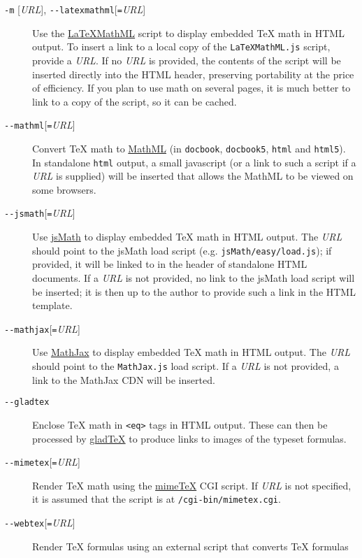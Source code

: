 \documentclass[]{article}
\begin{document}
\begin{description}
\item[\texttt{-m} {[}\emph{URL}{]},
\texttt{-\/-latexmathml}{[}\texttt{=}\emph{URL}{]}]
Use the \href{http://math.etsu.edu/LaTeXMathML/}{LaTeXMathML} script to
display embedded TeX math in HTML output. To insert a link to a local
copy of the \texttt{LaTeXMathML.js} script, provide a \emph{URL}. If no
\emph{URL} is provided, the contents of the script will be inserted
directly into the HTML header, preserving portability at the price of
efficiency. If you plan to use math on several pages, it is much better
to link to a copy of the script, so it can be cached.
\item[\texttt{-\/-mathml}{[}\texttt{=}\emph{URL}{]}]
Convert TeX math to \href{http://www.w3.org/Math/}{MathML} (in
\texttt{docbook}, \texttt{docbook5}, \texttt{html} and \texttt{html5}).
In standalone \texttt{html} output, a small javascript (or a link to
such a script if a \emph{URL} is supplied) will be inserted that allows
the MathML to be viewed on some browsers.
\item[\texttt{-\/-jsmath}{[}\texttt{=}\emph{URL}{]}]
Use \href{http://www.math.union.edu/~dpvc/jsmath/}{jsMath} to display
embedded TeX math in HTML output. The \emph{URL} should point to the
jsMath load script (e.g. \texttt{jsMath/easy/load.js}); if provided, it
will be linked to in the header of standalone HTML documents. If a
\emph{URL} is not provided, no link to the jsMath load script will be
inserted; it is then up to the author to provide such a link in the HTML
template.
\item[\texttt{-\/-mathjax}{[}\texttt{=}\emph{URL}{]}]
Use \href{https://www.mathjax.org}{MathJax} to display embedded TeX math
in HTML output. The \emph{URL} should point to the \texttt{MathJax.js}
load script. If a \emph{URL} is not provided, a link to the MathJax CDN
will be inserted.
\item[\texttt{-\/-gladtex}]
Enclose TeX math in \texttt{\textless{}eq\textgreater{}} tags in HTML
output. These can then be processed by
\href{http://ans.hsh.no/home/mgg/gladtex/}{gladTeX} to produce links to
images of the typeset formulas.
\item[\texttt{-\/-mimetex}{[}\texttt{=}\emph{URL}{]}]
Render TeX math using the
\href{http://www.forkosh.com/mimetex.html}{mimeTeX} CGI script. If
\emph{URL} is not specified, it is assumed that the script is at
\texttt{/cgi-bin/mimetex.cgi}.
\item[\texttt{-\/-webtex}{[}\texttt{=}\emph{URL}{]}]
Render TeX formulas using an external script that converts TeX formulas

\end{description}
\end{document}
